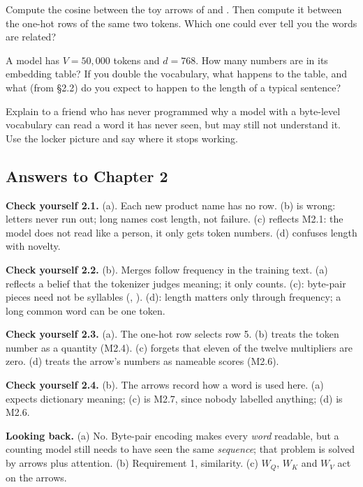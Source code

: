 \begin{exercise}
Compute the cosine between the toy arrows of  and . Then compute it between the
one-hot rows of the same two tokens. Which one could ever tell you the words are related?
\end{exercise}

\begin{exercise}
A model has $V=50{,}000$ tokens and $d=768$. How many numbers are in its embedding table? If you double
the vocabulary, what happens to the table, and what (from \S2.2) do you expect to happen to the length of a
typical sentence?
\end{exercise}

\begin{exercise}
Explain to a friend who has never programmed why a model with a byte-level vocabulary can read a word it has
never seen, but may still not understand it. Use the locker picture and say where it stops working.
\end{exercise}

\subsection*{Answers to Chapter 2}

\noindent\textbf{Check yourself 2.1.} (a). Each new product name has no row. (b) is wrong: letters never run
out; long names cost length, not failure. (c) reflects M2.1: the model does not read like a person, it only
gets token numbers. (d) confuses length with novelty.

\noindent\textbf{Check yourself 2.2.} (b). Merges follow frequency in the training text. (a) reflects a
belief that the tokenizer judges meaning; it only counts. (c): byte-pair pieces need not be syllables
(, ). (d): length matters only through frequency; a long common word can be one token.

\noindent\textbf{Check yourself 2.3.} (a). The one-hot row selects row 5. (b) treats the token number as a
quantity (M2.4). (c) forgets that eleven of the twelve multipliers are zero. (d) treats the arrow's numbers
as nameable scores (M2.6).

\noindent\textbf{Check yourself 2.4.} (b). The arrows record how a word is used here. (a) expects
dictionary meaning; (c) is M2.7, since nobody labelled anything; (d) is M2.6.

\noindent\textbf{Looking back.} (a) No. Byte-pair encoding makes every \emph{word} readable, but a counting
model still needs to have seen the same \emph{sequence}; that problem is solved by arrows plus attention.
(b) Requirement 1, similarity. (c) $W_Q$, $W_K$ and $W_V$ act on the arrows.

